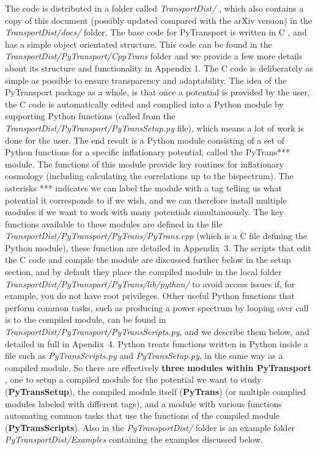 \documentclass[10pt,
amsmath,amssymb,
aps,prd,nofootinbib,eqsecnum,a4paper]{revtex4}
\newcommand{\CC}{C\nolinebreak\hspace{-.05em}\raisebox{.4ex}{\tiny\bf +}\nolinebreak\hspace{-.10em}\raisebox{.4ex}{\tiny\bf +}}
\def\CC{{C\nolinebreak[4]\hspace{-.05em}\raisebox{.4ex}{\tiny\bf ++}}}
\def\S{ }
\begin{document}
The code is distributed in a folder called {\it TransportDist/} , which also contains a copy of this document (possibly updated compared with the arXiv version) in the 
{\it TransportDist/docs/} folder. The base code for PyTransport is written in \CC \S , and has a simple object orientated structure. This code can be found 
in the {\it TransportDist/PyTransport/CppTrans} folder and we provide a few more details about its structure 
and functionality in  Appendix 1. 
The \CC \S code is deliberately as simple as possible to ensure transparency 
and adaptability. The idea of the PyTransport package as a 
whole, is that once a potential is provided by the user, 
the \CC \S  code is automatically edited and complied into a Python module by supporting 
Python functions (called from the {\it TransportDist/PyTransport/PyTransSetup.py} file), 
which means a lot of work is done for the user.  
The end result is a Python module consisting of a set of Python functions for a specific inflationary potential, called the 
PyTrans*** module. 
The functions of this module provide key routines for inflationary cosmology (including calculating the correlations 
up to the bispectrum). The asterisks *** indicates we can label the module with a tag telling us what potential it 
corresponds to if we wish, and we can 
therefore install multiple modules if we want to work with many potentials simultaneously. The 
key functions available to these modules 
are defined in the file {\it TransportDist/PyTransport/PyTrans/PyTrans.cpp} (which is a \CC \S  file defining the
 Python module), these function are detailed in Appendix~3.
The scripts  that edit the \CC \S code and compile the module are discussed further below in the setup section, 
and by default they place the compiled module in the local folder 
{\it TransportDist/PyTransport/PyTrans/lib/python/} to avoid access issues if, for example, you do not have root privileges. 
Other useful Python functions that perform common tasks, such as producing a power spectrum by looping 
over call is to the compiled module, can be 
found in {\it TransportDist/PyTransport/PyTransScripts.py}, and we describe them below, and detailed in full in Apendix~4. 
Python 
treats functions written in Python inside a file such as {\it PyTransScripts.py} and {\it PyTransSetup.py}, 
in the same way as a compiled module. 
So there are effectively {\bf three modules within PyTransport }, 
one to setup a compiled module for the potential we want to study ({\bf PyTransSetup}), the compiled module itself ({\bf PyTrans}) 
(or multiple complied modules labeled with different tags), and a 
module with various functions automating common tasks that 
use the functions of the compiled module ({\bf PyTransScripts}). 
Also in the {\it PyTransportDist/} folder is an example folder {\it PyTransportDist/Examples} 
containing the examples discussed below.
\end{document}
